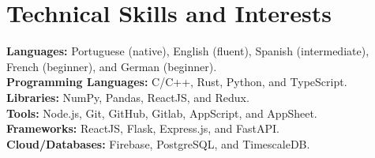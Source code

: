     \vspace{-3.0mm}
  \resumeSubHeadingListEnd
  

\section{\textbf{Technical Skills and Interests}}
\begin{itemize}[leftmargin=0.05in, label={}]
    \small{\item{
     \textbf{Languages:}{ Portuguese (native), English (fluent), Spanish (intermediate), French (beginner), and German (beginner).} \\
     \textbf{Programming Languages:}{ C/C++, Rust, Python, and TypeScript. } \\
     \textbf{Libraries:}{ NumPy, Pandas, ReactJS, and Redux. }\\ 
     \textbf{Tools:}{ Node.js, Git, GitHub, Gitlab, AppScript, and AppSheet. } \\ 
     \textbf{Frameworks:}{ ReactJS, Flask, Express.js, and FastAPI. } \\
     \textbf{Cloud/Databases:}{ Firebase, PostgreSQL, and TimescaleDB. } \\  
    }}
\end{itemize}


